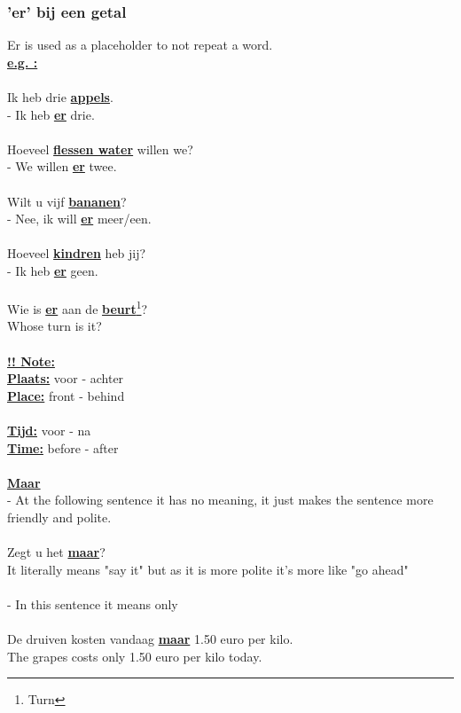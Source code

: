 \documentclass[a4paper,14pt]{extarticle}
\newcommand{\note}[2]{\underline{\textbf{#1}}\footnote{#2}}
\newcommand{\attention}[1]{\underline{\textbf{!! #1}}}
\newcommand{\emp}[1]{\underline{\textbf{#1}}}
\begin{document}
\subsubsection{'er' bij een getal}
\begin{paracol}{2}
Er is used as a placeholder to not repeat a word. \\
\emp{e.g. : } \\ \\
Ik heb drie \emp{appels}. \\
- Ik heb \emp{er} drie. \\ \\
Hoeveel \emp{flessen water} willen we? \\
- We willen \emp{er} twee. \\ \\ 
Wilt u vijf \emp{bananen}? \\ 
- Nee, ik will \emp{er} meer/een. \\ \\
Hoeveel \emp{kindren} heb jij? \\
- Ik heb \emp{er} geen. \\ \\
Wie is \emp{er} aan de \note{beurt}{Turn}? \\
Whose turn is it? \\
\switchcolumn
\hfill \\
\attention{Note:} \\
\emp{Plaats:} voor - achter \\
\emp{Place:} front - behind \\ \\
\emp{Tijd:} voor - na \\
\emp{Time:} before - after \\ \\
\emp{Maar} \\
- At the following sentence it has no meaning, it just makes the sentence more friendly and polite. \\ \\
Zegt u het \emp{maar}? \\
It literally means "say it" but as it is more polite it's more like "go ahead" \\ \\
- In this sentence it means only \\ \\
De druiven kosten vandaag \emp{maar} 1.50 euro per kilo. \\
The grapes costs only 1.50 euro per kilo today. \\
\end{paracol}
\end{document}
